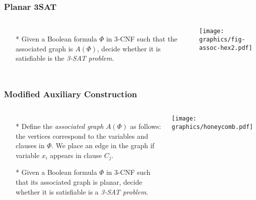 \documentclass{beamer}
\begin{document}
\begin{frame} \frametitle{Planar 3SAT}
    \begin{columns}[c]
        \begin{itemize}
            \item[*] Given a Boolean formula $\Phi$ in 3-CNF such that the associated graph is $A(\Phi)$, decide whether it 
is satisfiable is the \textit{3-SAT problem}.
        \end{itemize}
        \begin{minipage}{\linewidth}
            \begin{center}
            \texttt{[image: graphics/fig-assoc-hex2.pdf]}
            \end{center}
        \end{minipage}
    \end{columns}
\end{frame}
\begin{frame} \frametitle{Modified Auxiliary Construction}
    \begin{columns}[c]
        \begin{itemize}
            \item[*] Define the \textit{associated graph} $A(\Phi)$ as follows: the vertices correspond to the variables and clauses in $\Phi$.   
We place an edge in the graph if variable $x_i$ appears in clause $C_j$.
            \item[*] Given a Boolean formula $\Phi$ in 3-CNF such that its associated graph is planar, decide whether it 
is satisfiable is a \textit{3-SAT problem}.
        \end{itemize}
        \begin{minipage}{\linewidth}
            \begin{center}
            \texttt{[image: graphics/honeycomb.pdf]}
            \end{center}
        \end{minipage}
    \end{columns}
\end{frame}
\end{document}
